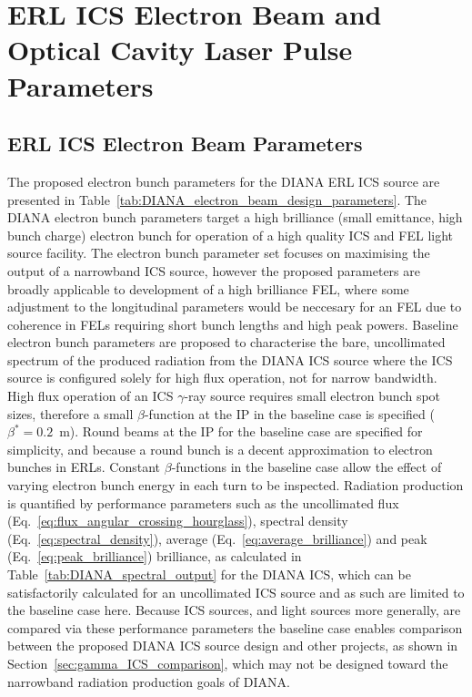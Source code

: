 \documentclass[../main.tex]{subfiles}
\begin{document}
\section{ERL ICS Electron Beam and Optical Cavity Laser Pulse Parameters}

\subsection{ERL ICS Electron Beam Parameters }

The proposed electron bunch parameters for the DIANA ERL ICS source are presented in Table~\ref{tab:DIANA_electron_beam_design_parameters}. The DIANA electron bunch parameters target a high brilliance (small emittance, high bunch charge) electron bunch for operation of a high quality ICS and FEL light source facility. The electron bunch parameter set focuses on maximising the output of a narrowband ICS source, however the proposed parameters are broadly applicable to development of a high brilliance FEL, where some adjustment to the longitudinal parameters would be neccesary for an FEL due to coherence in FELs requiring short bunch lengths and high peak powers.    
Baseline electron bunch parameters are proposed to characterise the bare, uncollimated spectrum of the produced radiation from the DIANA ICS source where the ICS source is configured solely for high flux operation, not for narrow bandwidth. High flux operation of an ICS $\gamma$-ray source requires small electron bunch spot sizes, therefore a small $\beta$-function at the IP in the baseline case is specified ($\beta^{*}=0.2$~\si{\meter}). Round beams at the IP for the baseline case are specified for simplicity, and because a round bunch is a decent approximation to electron bunches in ERLs. Constant $\beta$-functions in the baseline case allow the effect of varying electron bunch energy in each turn to be inspected. Radiation production is quantified by performance parameters such as the uncollimated flux (Eq.~\ref{eq:flux_angular_crossing_hourglass}), spectral density (Eq.~\ref{eq:spectral_density}), average (Eq.~\ref{eq:average_brilliance}) and peak (Eq.~\ref{eq:peak_brilliance}) brilliance, as calculated in Table~\ref{tab:DIANA_spectral_output} for the DIANA ICS, which can be satisfactorily calculated for an uncollimated ICS source and as such are limited to the baseline case here. Because ICS sources, and light sources more generally, are compared via these performance parameters the baseline case enables comparison between the proposed DIANA ICS source design and other projects, as shown in Section~\ref{sec:gamma_ICS_comparison}, which may not be designed toward the narrowband radiation production goals of DIANA.
\end{document}
